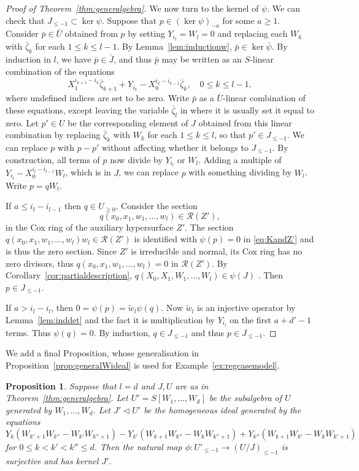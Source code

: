 \documentclass[a4paper,11pt]{amsart}
\theoremstyle{plain}
\newtheorem{proposition}[theorem]{Proposition}
\theoremstyle{definition}
\newcommand{\R}{\mathcal{R}}
\begin{document}
\begin{proof}[Proof of Theorem~\ref{thm:generalgebra}]
    We now turn to the kernel of $\psi$. We can check that $J_{\leq -1} \subset \ker \psi$. Suppose that $p \in (\ker \psi)_{-a}$ for some $a \geq 1$. Consider $\bar p \in \bar U$ obtained from $p$ by setting $Y_{i_l} = W_l = 0$ and replacing each $W_k$ with $\bar \zeta_k$ for each $1 \leq k \leq l-1$. By Lemma~\ref{lem:inductionw}, $\bar p \in \ker \bar \psi$. By induction in $l$, we have $\bar p \in \bar J$, and thus $\bar p$ may be written as an $S$-linear combination of the equations
\[
X_1^{i_{k+1} - i_{k}} \bar \zeta_{k+1} + Y_{i_k} - X_0^{i_k - i_{k-1}} \bar \zeta_{k}, \quad 0 \leq k \leq l-1,
\]
where undefined indices are set to be zero. Write $\bar p$ as a $\bar U$-linear combination of these equations, except leaving the variable $\bar \zeta_l$ in where it is usually set it equal to zero. Let $p' \in U$ be the corresponding element of $J$ obtained from this linear combination by replacing $\bar \zeta_k$ with $W_k$ for each $1 \leq k \leq l$, so that $p' \in J_{\leq -1}$. We can replace $p$ with $p-p'$ without affecting whether it belongs to $J_{\leq -1}$. By construction, all terms of $p$ now divide by $Y_{i_l}$ or $W_l$. Adding a multiple of $Y_{i_l} - X_0^{i_l - i_{l-1}}W_l$, which is in $J$, we can replace $p$ with something dividing by $W_l$. Write $p = q W_l$.

If $a \leq i_l - i_{l-1}$ then $q \in U_{\geq 0}$. Consider the section \[q(x_0,x_1,w_1,\dots,w_l)\in\R(Z'),\] in the Cox ring of the auxiliary hypersurface $Z'$. The section $q(x_0,x_1,w_1,\dots,w_l)w_l \in \R(Z')$ is identified with $\psi(p) = 0$ in \eqref{eq:KandZ'} and is thus the zero section. Since $Z'$ is irreducible and normal, its Cox ring has no zero divisors, thus $q(x_0,x_1,w_1,\dots,w_l) = 0$ in $\R(Z')$. By Corollary~\ref{cor:partialdescription}, $q(X_0, X_1,W_1,\dots,W_l) \in \psi(J)$ . Then $p \in J_{\leq -1}$.

If $a > i_l -i_l$, then $0 = \psi (p) = \tilde w_l \psi(q)$. Now $\tilde w_l$ is an injective operator by Lemma~\ref{lem:inddet} and the fact it is multiplication by $Y_{i_l}$ on the first $a + d'-1$ terms. Thus $\psi(q) = 0$. By induction, $q \in J_{\leq -1}$ and thus $p\in J_{\leq -1}$. 
\end{proof}

We add a final Proposition, whose generalisation in Proposition~\ref{prop:generalWideal} is used for Example~\ref{ex:regcasemodel}.

\begin{proposition}\label{prop:universalWideal}
    Suppose that $l = d$ and $J, U$ are as in Theorem~\ref{thm:generalgebra}. Let $U' = S[W_1,\dots,W_d]$ be the subalgebra of $U$ generated by $W_1,\dots,W_d$. Let $J' \lhd U'$ be the homogeneous ideal generated by the equations
    \[
    Y_k (W_{k'+1} W_{k''} - W_{k'} W_{k''+1}) - Y_{k'} (W_{k+1} W_{k''} - W_k W_{k''+1}) + Y_{k''} (W_{k+1} W_{k'} - W_k W_{k'+1})
    \]
    for $0 \leq k < k' < k'' \leq d$. Then the natural map $\phi:U'_{\leq -1} \rightarrow (U/J)_{\leq -1} $ is surjective and has kernel $J'$.
\end{proposition}
\end{document}
